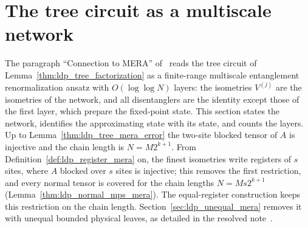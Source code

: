 \section{The tree circuit as a multiscale network}
\label{sec:ldp_tree_mera}

The paragraph ``Connection to MERA'' of~\cite{Malz2024Preparation} reads the
tree circuit of Lemma~\ref{thm:ldp_tree_factorization} as a finite-range
multiscale entanglement renormalization ansatz with $O(\log\log N)$ layers: the
isometries $V^{(j)}$ are the isometries of the network, and all disentanglers
are the identity except those of the first layer, which prepare the
fixed-point state. This section states the network, identifies the
approximating state with its state, and counts the layers. Up to
Lemma~\ref{thm:ldp_tree_mera_error} the two-site blocked tensor of $A$ is
injective and the chain length is $N=M2^{k+1}$. From
Definition~\ref{def:ldp_register_mera} on, the finest isometries write
registers of $s$ sites, where $A$ blocked over $s$ sites is injective; this
removes the first restriction, and every normal tensor is covered for the
chain lengths $N=Ms2^{k+1}$ (Lemma~\ref{thm:ldp_normal_mps_mera}). The
equal-register construction keeps this restriction on the chain length.
Section~\ref{sec:ldp_unequal_mera} removes it with unequal bounded physical
leaves, as detailed in the resolved note~\cite{gap:mswc24_tree_mera_scope}.

